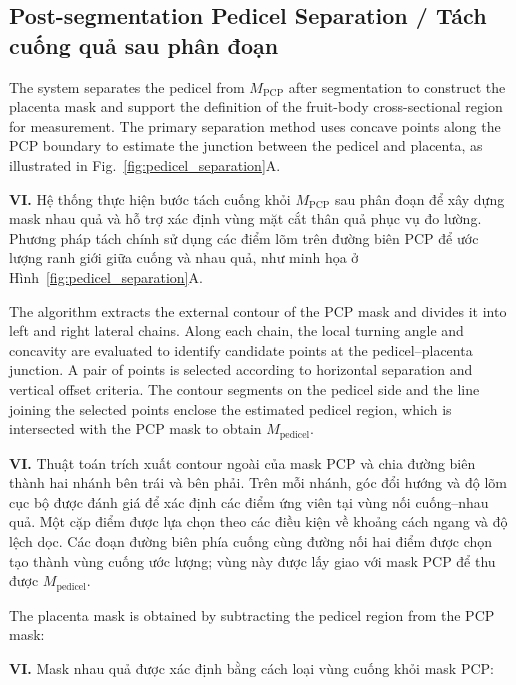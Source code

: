 \documentclass[final,1p,11pt,longtitle]{elsarticle}
\newenvironment{viet}{\par\smallskip\begingroup\color{viColor}\noindent\textbf{VI. }\ignorespaces}{\par\endgroup\smallskip}
\begin{document}
\subsection*{Post-segmentation Pedicel Separation / {\color{viColor} Tách cuống quả sau phân đoạn}}
The system separates the pedicel from $M_{\mathrm{PCP}}$ after segmentation to construct the placenta mask and support the definition of the fruit-body cross-sectional region for measurement. The primary separation method uses concave points along the PCP boundary to estimate the junction between the pedicel and placenta, as illustrated in Fig.~\ref{fig:pedicel_separation}A.

\begin{viet}
Hệ thống thực hiện bước tách cuống khỏi $M_{\mathrm{PCP}}$ sau phân đoạn để xây dựng mask nhau quả và hỗ trợ xác định vùng mặt cắt thân quả phục vụ đo lường. Phương pháp tách chính sử dụng các điểm lõm trên đường biên PCP để ước lượng ranh giới giữa cuống và nhau quả, như minh họa ở Hình~\ref{fig:pedicel_separation}A.
\end{viet}


The algorithm extracts the external contour of the PCP mask and divides it into left and right lateral chains. Along each chain, the local turning angle and concavity are evaluated to identify candidate points at the pedicel--placenta junction. A pair of points is selected according to horizontal separation and vertical offset criteria. The contour segments on the pedicel side and the line joining the selected points enclose the estimated pedicel region, which is intersected with the PCP mask to obtain $M_{\mathrm{pedicel}}$.

\begin{viet}
Thuật toán trích xuất contour ngoài của mask PCP và chia đường biên thành hai nhánh bên trái và bên phải. Trên mỗi nhánh, góc đổi hướng và độ lõm cục bộ được đánh giá để xác định các điểm ứng viên tại vùng nối cuống--nhau quả. Một cặp điểm được lựa chọn theo các điều kiện về khoảng cách ngang và độ lệch dọc. Các đoạn đường biên phía cuống cùng đường nối hai điểm được chọn tạo thành vùng cuống ước lượng; vùng này được lấy giao với mask PCP để thu được $M_{\mathrm{pedicel}}$.
\end{viet}




The placenta mask is obtained by subtracting the pedicel region from the PCP mask:

\begin{viet}
Mask nhau quả được xác định bằng cách loại vùng cuống khỏi mask PCP:
\end{viet}
\end{document}
